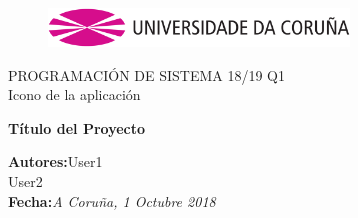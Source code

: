 \documentclass[a4paper,openright,12pt]{article}
\begin{document}
\begin{titlepage}

\begin{center}
\vspace*{-1in}
\begin{figure}[htb]
\begin{center}
\includegraphics[width=8cm]{udc.eps}
\end{center}
\end{figure}

\vspace*{1in}
PROGRAMACIÓN DE SISTEMA 18/19 Q1\\
Icono de la aplicación\\
\vspace*{1in}
\begin{Large}
\textbf{Título del Proyecto} \\
\end{Large}

\vspace*{3in}

\begin{large}
\raggedleft
\textbf{Autores:}User1 \\
User2\\
\textbf{Fecha:}\textit{A Coruña, 1 Octubre 2018}\\
\end{large}

\end{center}
\end{titlepage} 

\newpage



\tableofcontents

\vspace{5cm}
\end{document}
